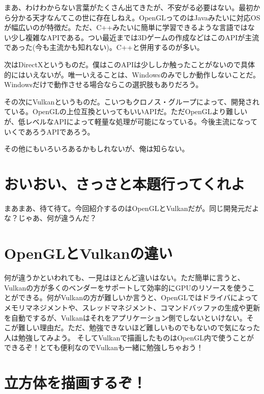 \documentclass[12pt,a4paper]{jsarticle}
\begin{document}
まあ、わけわからない言葉がたくさん出てきたが、不安がる必要はない。最初から分かる天才なんてこの世に存在しねえ。OpenGLってのはJavaみたいに対応OSが幅広いのが特徴だ。ただ、C++みたいに簡単に学習できるような言語ではない少し複雑なAPIである。つい最近までは3Dゲームの作成などはこのAPIが主流であった(今も主流かも知れない)。C++と併用するのが多い。

次はDirectXというものだ。僕はこのAPIは少ししか触ったことがないので具体的にはいえないが。唯一いえることは、Windowsのみでしか動作しないことだ。Windowsだけで動作させる場合ならこの選択肢もありだろう。

その次にVulkanというものだ。こいつもクロノス・グループによって、開発されている。OpenGLの上位互換といってもいいAPIだ。ただOpenGLより難しいが、低レベルなAPIによって軽量な処理が可能になっている。今後主流になっていくであろうAPIであろう。

その他にもいろいろあるかもしれないが、俺は知らない。


\section{おいおい、さっさと本題行ってくれよ}
 まあまあ、待て待て。今回紹介するのはOpenGLとVulkanだが。同じ開発元だよな？じゃあ、何が違うんだ？

\section{OpenGLとVulkanの違い}
 何が違うかといわれても、一見はほとんど違いはない。ただ簡単に言うと、Vulkanの方が多くのベンダーをサポートして効率的にGPUのリソースを使うことができる。何がVulkanの方が難しいか言うと、OpenGLではドライバによってメモリマネジメントや、スレッドマネジメント、コマンドバッファの生成や更新を自動でするが、Vulkanはそれをアプリケーション側でしないといけない。そこが難しい理由だ。ただ、勉強できないほど難しいものでもないので気になった人は勉強してみよう。
 そしてVulkanで描画したものはOpenGL内で使うことができるぞ！とても便利なのでVulkanも一緒に勉強しちゃおう！

\section{立方体を描画するぞ！}
\end{document}
